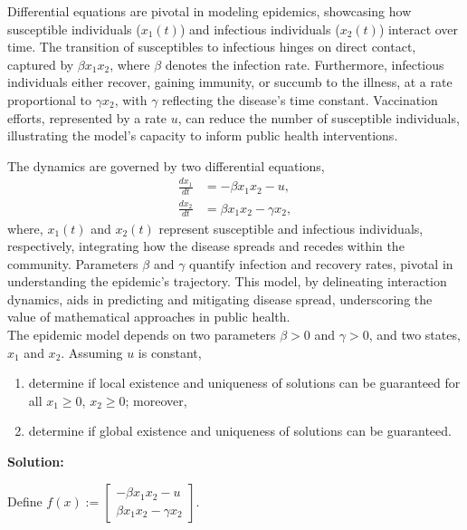 \Qed


\bigskip

\begin{exercise} Differential equations are pivotal in modeling epidemics, showcasing how susceptible individuals ($x_1(t)$) and infectious individuals ($x_2(t)$) interact over time. The transition of susceptibles to infectious hinges on direct contact, captured by $\beta x_1 x_2$, where $\beta$ denotes the infection rate. Furthermore, infectious individuals either recover, gaining immunity, or succumb to the illness, at a rate proportional to $\gamma x_2$, with $\gamma$ reflecting the disease's time constant. Vaccination efforts, represented by a rate $u$, can reduce the number of susceptible individuals, illustrating the model's capacity to inform public health interventions.

The dynamics are governed by two differential equations,
\begin{align}
\frac{d x_1}{dt} &= -\beta x_1 x_2 - u, \\
\frac{d x_2}{dt} &= \beta x_1 x_2 - \gamma x_2,
\end{align}
where, $x_1(t)$ and $x_2(t)$ represent susceptible and infectious individuals, respectively, integrating how the disease spreads and recedes within the community. Parameters $\beta$ and $\gamma$ quantify infection and recovery rates, pivotal in understanding the epidemic's trajectory. This model, by delineating interaction dynamics, aids in predicting and mitigating disease spread, underscoring the value of mathematical approaches in public health. \\

The epidemic model depends on two parameters $\beta >0$ and $\gamma>0$, and two states, $x_1$ and $x_2$. Assuming $u$ is constant, 
\begin{enumerate}
\renewcommand{\labelenumi}{(\alph{enumi})}
 \setlength{\itemsep}{.2cm}
    \item determine if local existence and uniqueness of solutions can be guaranteed for all $x_1\ge 0$, $x_2\ge 0$; moreover, 
    \item determine if global existence and uniqueness of solutions can be guaranteed.
\end{enumerate}

\end{exercise}
\textbf{Solution:}

Define $f(x) := \left[ \begin{array}{l}  -\beta x_1 x_2 - u \\ \beta x_1 x_2 - \gamma x_2 \end{array}\right]$.\\

